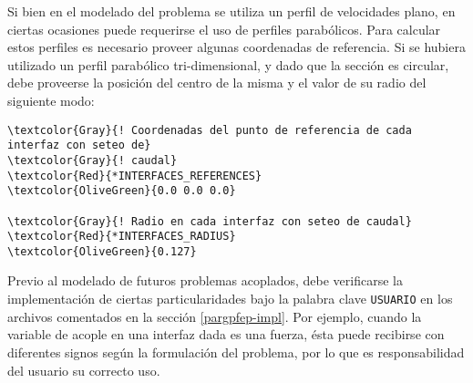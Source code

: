 Si bien en el modelado del problema se utiliza un perfil de velocidades plano, en ciertas ocasiones puede requerirse el uso de perfiles parabólicos.
Para calcular estos perfiles es necesario proveer algunas coordenadas de referencia.
Si se hubiera utilizado un perfil parabólico tri-dimensional,
y dado que la sección es circular,
debe proveerse la posición del centro de la misma y el valor de su radio del siguiente modo:
\begin{Verbatim}[frame=single,commandchars=\\\{\}]
\textcolor{Gray}{! Coordenadas del punto de referencia de cada interfaz con seteo de}
\textcolor{Gray}{! caudal}
\textcolor{Red}{*INTERFACES_REFERENCES}
\textcolor{OliveGreen}{0.0 0.0 0.0}

\textcolor{Gray}{! Radio en cada interfaz con seteo de caudal}
\textcolor{Red}{*INTERFACES_RADIUS}
\textcolor{OliveGreen}{0.127}
\end{Verbatim}

Previo al modelado de futuros problemas acoplados, debe verificarse la implementación de ciertas particularidades
bajo la palabra clave \texttt{USUARIO} en los archivos comentados en la sección \ref{pargpfep-impl}.
Por ejemplo, cuando la variable de acople en una interfaz dada es una fuerza, ésta puede recibirse con diferentes signos según la formulación del problema,
por lo que es responsabilidad del usuario su correcto uso.
